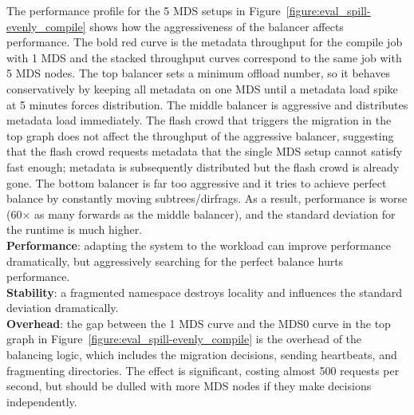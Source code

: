 The performance profile for the 5 MDS setups in Figure~\ref{figure:eval_spill-evenly_compile} shows how the aggressiveness of the balancer affects performance. The bold red curve is the metadata throughput for the compile job with 1 MDS and the stacked throughput curves correspond to the same job with 5 MDS nodes. The top balancer sets a minimum offload number, so it behaves conservatively by keeping all metadata on one MDS until a metadata load spike at 5 minutes forces distribution. The middle balancer is aggressive and distributes metadata load immediately. The flash crowd that triggers the migration in the top graph does not affect the throughput of the aggressive balancer, suggesting that the flash crowd requests metadata that the single MDS setup cannot satisfy fast enough; metadata is subsequently distributed but the flash crowd is already gone. The bottom balancer is far too aggressive and it  tries to achieve perfect balance by constantly moving subtrees/dirfrags. As a result, performance is worse (60\(\times\) as many forwards as the middle balancer), and the standard deviation for the runtime is much higher.\\

\noindent\textbf{Performance}: adapting the system to the workload can improve performance dramatically, but aggressively searching for the perfect balance hurts performance.\\
\noindent\textbf{Stability}: a fragmented namespace destroys locality and influences the standard deviation dramatically.\\
\noindent\textbf{Overhead}: the gap between the 1 MDS curve and the MDS0 curve in the top graph in Figure~\ref{figure:eval_spill-evenly_compile} is the overhead of the balancing logic, which includes the migration decisions, sending heartbeats, and fragmenting directories. The effect is significant, costing almost 500 requests per second, but should be dulled with more MDS nodes if they make decisions independently.

